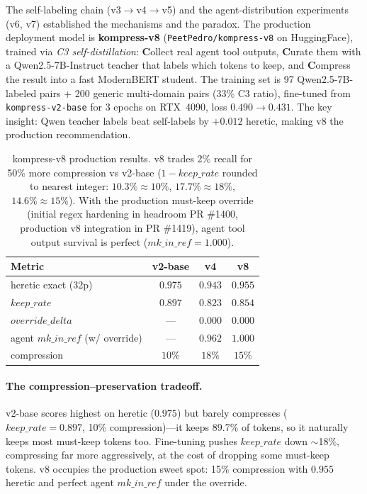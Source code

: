 The self-labeling chain (v3$\to$v4$\to$v5) and the agent-distribution
experiments (v6, v7) established the mechanisms and the paradox. The
production deployment model is \textbf{kompress-v8}
(\texttt{PeetPedro/kompress-v8} on HuggingFace), trained via \emph{C3
self-distillation}: \textbf{C}ollect real agent tool outputs, \textbf{C}urate
them with a Qwen2.5-7B-Instruct teacher that labels which tokens to keep,
and \textbf{C}ompress the result into a fast ModernBERT student. The training
set is 97 Qwen2.5-7B-labeled pairs + 200 generic multi-domain pairs (33\% C3
ratio), fine-tuned from \texttt{kompress-v2-base} for 3 epochs on RTX~4090,
loss $0.490\to0.431$. The key insight: Qwen teacher labels beat self-labels
by $+0.012$ heretic, making v8 the production recommendation.

\begin{table}[h]
\centering
\caption{kompress-v8 production results. v8 trades 2\% recall for 50\%
more compression vs v2-base ($1-\mathit{keep\_rate}$ rounded to nearest
integer: $10.3\%\approx10\%$, $17.7\%\approx18\%$, $14.6\%\approx15\%$). With
the production must-keep override (initial regex hardening in headroom PR
\#1400, production v8 integration in PR \#1419), agent tool output survival is
perfect ($\mathit{mk\_in\_ref}{=}1.000$).}
\label{tab:v8_results}
\begin{tabular}{lccc}
\toprule
Metric & v2-base & v4 & \textbf{v8} \\
\midrule
heretic exact (32p)              & $0.975$ & $0.943$ & $\mathbf{0.955}$ \\
$\mathit{keep\_rate}$            & $0.897$ & $0.823$ & $0.854$ \\
$\mathit{override\_delta}$       & ---     & $0.000$ & $\mathbf{0.000}$ \\
agent $\mathit{mk\_in\_ref}$ (w/ override) & --- & $0.962$ & $\mathbf{1.000}$ \\
compression                      & $10\%$  & $18\%$  & $15\%$ \\
\bottomrule
\end{tabular}
\end{table}

\paragraph{The compression--preservation tradeoff.} v2-base scores highest
on heretic ($0.975$) but barely compresses ($\mathit{keep\_rate}{=}0.897$,
10\% compression)---it keeps 89.7\% of tokens, so it naturally keeps most
must-keep tokens too. Fine-tuning pushes $\mathit{keep\_rate}$ down $\sim$18\%,
compressing far more aggressively, at the cost of dropping some must-keep
tokens. v8 occupies the production sweet spot: 15\% compression with
$0.955$ heretic and perfect agent $\mathit{mk\_in\_ref}$ under the override.


